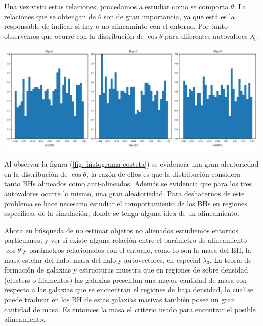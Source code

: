 Una vez visto estas relaciones, procedamos a estudiar como se comporta $\theta$. La relaciones que se obtengan de $\theta$ son de gran importancia, ya que está es la responsable de indicar si hay o no alineaminto con el entorno. Por tanto observemos que ocurre con la distribución de $\cos \theta$ para diferentes autovalores $\lambda_{i}$.
%
\begin{center}
\includegraphics[scale=.35]{./figures/6_Resultados/cosmo01/histograma_cos_theta.png}
\label{fig: histograma costeta}
\end{center}
%
Al observar la figura (\ref{fig: histograma costeta}) se evidencia una gran aleatoriedad en la distribución de $\cos\theta$, la razón de ellos es que la distribución considera tanto BHs alineados como anti-alineados. Además se evidencia que para los tres autovalores ocurre lo mismo, una gran aleatoriedad. Para deshacernos de este problema se hace necesario estudiar el comportamiento de los BHs en regiones especificas de la simulación, donde se tenga alguna idea de un alineamiento.  

Ahora en búsqueda de no estimar objetos no alienados estudiemos entornos particulares, y ver si existe alguna relación entre el parámetro de alineamiento $\cos\theta$ y parámetros relacionados con el entorno, como lo son la masa del BH, la masa estelar del halo, masa del halo y autovectores, en especial $\lambda_{3}$. La teoría de formación de galaxias y estructuras muestra que en regiones de sobre densidad (clusters o filamentos) las galaxias presentan una mayor cantidad de masa  con respecto a las galaxias que se encuentran el regiones de baja densidad, lo cual se puede traducir en los BH de estas galaxias masivas también posee un gran cantidad de masa. Es entonces la masa el criterio usado para encontrar el posible alineamiento. 


